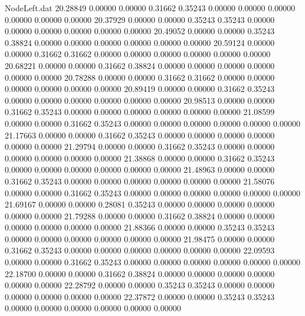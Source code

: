 \begin{filecontents}{NodeLeft.dat}
  20.28849    0.00000    0.00000     0.31662    0.35243    0.00000    0.00000    0.00000    0.00000    0.00000    0.00000
  20.37929    0.00000    0.00000     0.35243    0.35243    0.00000    0.00000    0.00000    0.00000    0.00000    0.00000
  20.49052    0.00000    0.00000     0.35243    0.38824    0.00000    0.00000    0.00000    0.00000    0.00000    0.00000
  20.59124    0.00000    0.00000     0.31662    0.31662    0.00000    0.00000    0.00000    0.00000    0.00000    0.00000
  20.68221    0.00000    0.00000     0.31662    0.38824    0.00000    0.00000    0.00000    0.00000    0.00000    0.00000
  20.78288    0.00000    0.00000     0.31662    0.31662    0.00000    0.00000    0.00000    0.00000    0.00000    0.00000
  20.89419    0.00000    0.00000     0.31662    0.35243    0.00000    0.00000    0.00000    0.00000    0.00000    0.00000
  20.98513    0.00000    0.00000     0.31662    0.35243    0.00000    0.00000    0.00000    0.00000    0.00000    0.00000
  21.08599    0.00000    0.00000     0.31662    0.35243    0.00000    0.00000    0.00000    0.00000    0.00000    0.00000
  21.17663    0.00000    0.00000     0.31662    0.35243    0.00000    0.00000    0.00000    0.00000    0.00000    0.00000
  21.29794    0.00000    0.00000     0.31662    0.35243    0.00000    0.00000    0.00000    0.00000    0.00000    0.00000
  21.38868    0.00000    0.00000     0.31662    0.35243    0.00000    0.00000    0.00000    0.00000    0.00000    0.00000
  21.48963    0.00000    0.00000     0.31662    0.35243    0.00000    0.00000    0.00000    0.00000    0.00000    0.00000
  21.58076    0.00000    0.00000     0.31662    0.35243    0.00000    0.00000    0.00000    0.00000    0.00000    0.00000
  21.69167    0.00000    0.00000     0.28081    0.35243    0.00000    0.00000    0.00000    0.00000    0.00000    0.00000
  21.79288    0.00000    0.00000     0.31662    0.38824    0.00000    0.00000    0.00000    0.00000    0.00000    0.00000
  21.88366    0.00000    0.00000     0.35243    0.35243    0.00000    0.00000    0.00000    0.00000    0.00000    0.00000
  21.98475    0.00000    0.00000     0.31662    0.35243    0.00000    0.00000    0.00000    0.00000    0.00000    0.00000
  22.09593    0.00000    0.00000     0.31662    0.35243    0.00000    0.00000    0.00000    0.00000    0.00000    0.00000
  22.18700    0.00000    0.00000     0.31662    0.38824    0.00000    0.00000    0.00000    0.00000    0.00000    0.00000
  22.28792    0.00000    0.00000     0.35243    0.35243    0.00000    0.00000    0.00000    0.00000    0.00000    0.00000
  22.37872    0.00000    0.00000     0.35243    0.35243    0.00000    0.00000    0.00000    0.00000    0.00000    0.00000

\end{filecontents}
